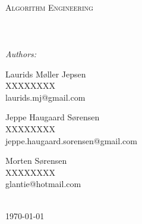 \documentclass[11pt, a4paper, oneside]{Thesis} %
\begin{document}
\begin{titlepage}
\begin{center}

\textsc{\LARGE \univname}\\[1.5cm] %
\textsc{\Large Algorithm Engineering}\\[0.5cm] %

\HRule \\[0.4cm] %
{\huge \bfseries \ttitle}\\[0.4cm] %
\HRule \\[1.5cm] %
 
\large\emph{Authors:}\\[1cm]

\begin{minipage}{0.3\textwidth}
\begin{flushleft} \normalsize
{Laurids Møller Jepsen
\\ XXXXXXXX
\\ {\tiny laurids.mj@gmail.com}
}
\end{flushleft}
\end{minipage}
\begin{minipage}{0.3\textwidth}\normalsize\center
{Jeppe Haugaard Sørensen
\\ XXXXXXXX
\\ {\tiny jeppe.haugaard.sorensen@gmail.com}
}
\end{minipage}
\begin{minipage}{0.3\textwidth}
\begin{flushright}\normalsize
{Morten Sørensen
\\ XXXXXXXX
\\ {\tiny glantie@hotmail.com}
}
\end{flushright}
\end{minipage}
\\[3cm]
 
 
{\large \today}\\[4cm] %
 
\vfill
\end{center}

\end{titlepage}
\end{document}
